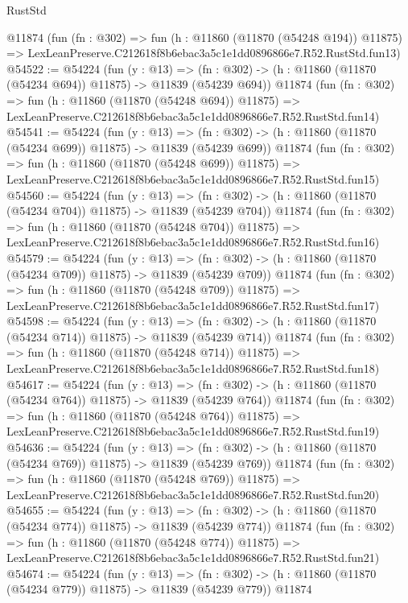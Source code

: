 \begin{lexlean}{RustStd}
\begin{coremodule}
    @11874
    (fun (fn : @302) =>
    fun (h : @11860 (@11870 (@54248 @194)) @11875) =>
    LexLeanPreserve.C212618f8b6ebac3a5c1e1dd0896866e7.R52.RustStd.fun13)
@54522 := @54224
    (fun (y : @13) =>
    (fn : @302) -> (h : @11860 (@11870 (@54234 @694)) @11875) -> @11839 (@54239 @694))
    @11874
    (fun (fn : @302) =>
    fun (h : @11860 (@11870 (@54248 @694)) @11875) =>
    LexLeanPreserve.C212618f8b6ebac3a5c1e1dd0896866e7.R52.RustStd.fun14)
@54541 := @54224
    (fun (y : @13) =>
    (fn : @302) -> (h : @11860 (@11870 (@54234 @699)) @11875) -> @11839 (@54239 @699))
    @11874
    (fun (fn : @302) =>
    fun (h : @11860 (@11870 (@54248 @699)) @11875) =>
    LexLeanPreserve.C212618f8b6ebac3a5c1e1dd0896866e7.R52.RustStd.fun15)
@54560 := @54224
    (fun (y : @13) =>
    (fn : @302) -> (h : @11860 (@11870 (@54234 @704)) @11875) -> @11839 (@54239 @704))
    @11874
    (fun (fn : @302) =>
    fun (h : @11860 (@11870 (@54248 @704)) @11875) =>
    LexLeanPreserve.C212618f8b6ebac3a5c1e1dd0896866e7.R52.RustStd.fun16)
@54579 := @54224
    (fun (y : @13) =>
    (fn : @302) -> (h : @11860 (@11870 (@54234 @709)) @11875) -> @11839 (@54239 @709))
    @11874
    (fun (fn : @302) =>
    fun (h : @11860 (@11870 (@54248 @709)) @11875) =>
    LexLeanPreserve.C212618f8b6ebac3a5c1e1dd0896866e7.R52.RustStd.fun17)
@54598 := @54224
    (fun (y : @13) =>
    (fn : @302) -> (h : @11860 (@11870 (@54234 @714)) @11875) -> @11839 (@54239 @714))
    @11874
    (fun (fn : @302) =>
    fun (h : @11860 (@11870 (@54248 @714)) @11875) =>
    LexLeanPreserve.C212618f8b6ebac3a5c1e1dd0896866e7.R52.RustStd.fun18)
@54617 := @54224
    (fun (y : @13) =>
    (fn : @302) -> (h : @11860 (@11870 (@54234 @764)) @11875) -> @11839 (@54239 @764))
    @11874
    (fun (fn : @302) =>
    fun (h : @11860 (@11870 (@54248 @764)) @11875) =>
    LexLeanPreserve.C212618f8b6ebac3a5c1e1dd0896866e7.R52.RustStd.fun19)
@54636 := @54224
    (fun (y : @13) =>
    (fn : @302) -> (h : @11860 (@11870 (@54234 @769)) @11875) -> @11839 (@54239 @769))
    @11874
    (fun (fn : @302) =>
    fun (h : @11860 (@11870 (@54248 @769)) @11875) =>
    LexLeanPreserve.C212618f8b6ebac3a5c1e1dd0896866e7.R52.RustStd.fun20)
@54655 := @54224
    (fun (y : @13) =>
    (fn : @302) -> (h : @11860 (@11870 (@54234 @774)) @11875) -> @11839 (@54239 @774))
    @11874
    (fun (fn : @302) =>
    fun (h : @11860 (@11870 (@54248 @774)) @11875) =>
    LexLeanPreserve.C212618f8b6ebac3a5c1e1dd0896866e7.R52.RustStd.fun21)
@54674 := @54224
    (fun (y : @13) =>
    (fn : @302) -> (h : @11860 (@11870 (@54234 @779)) @11875) -> @11839 (@54239 @779))
    @11874

\end{coremodule}
\end{lexlean}
